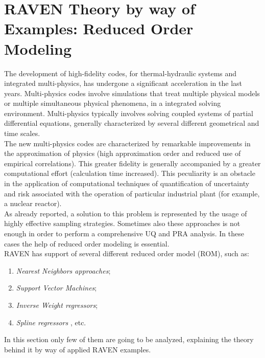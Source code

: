 \section{RAVEN Theory by way of Examples: Reduced Order Modeling}
The development of high-fidelity codes, for thermal-hydraulic systems 
and integrated multi-physics, has undergone a significant acceleration 
in the last years. Multi-physics codes involve simulations that treat 
multiple physical models or multiple simultaneous physical phenomena, 
in a integrated solving environment. Multi-physics typically involves 
solving coupled systems of partial differential equations, generally 
characterized by several different geometrical and time scales. 
\\The new multi-physics codes are characterized by remarkable 
improvements 
in the approximation of physics (high approximation order and reduced 
use of empirical correlations). This greater fidelity is generally 
accompanied by a greater computational effort (calculation time 
increased). This peculiarity is an 
obstacle in the application of  computational techniques of 
quantification of uncertainty and risk associated with the operation of 
particular industrial plant (for example, a nuclear reactor). 
\\As already reported, a solution to this problem is represented by the 
usage
of highly effective sampling strategies. Sometimes also these 
approaches is not enough
in order to perform a comprehensive UQ and PRA analysis. In these 
cases the help of reduced order modeling is essential.
\\RAVEN has support of several different reduced order model (ROM), 
such as:
\begin{enumerate}
  \item \textit{Nearest Neighbors approaches};
  \item \textit{Support Vector Machines};
  \item \textit{Inverse Weight regressors};
  \item \textit{Spline regressors }, etc.
\end{enumerate}
In this section only few of them are going to be analyzed, explaining the theory behind it
by way of applied RAVEN examples.

